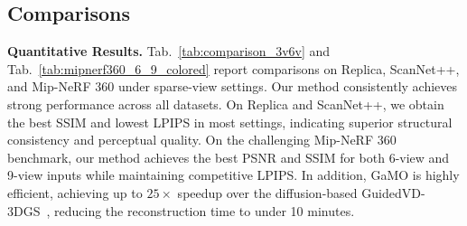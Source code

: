 \documentclass[runningheads]{llncs}
\begin{document}
\subsection{Comparisons}
\noindent\textbf{Quantitative Results.} 
Tab.~\ref{tab:comparison_3v6v} and Tab.~\ref{tab:mipnerf360_6_9_colored} report comparisons on Replica, ScanNet++, and Mip-NeRF 360 under sparse-view settings. Our method consistently achieves strong performance across all datasets. On Replica and ScanNet++, we obtain the best SSIM and lowest LPIPS in most settings, indicating superior structural consistency and perceptual quality. On the challenging Mip-NeRF 360 benchmark, our method achieves the best PSNR and SSIM for both 6-view and 9-view inputs while maintaining competitive LPIPS. In addition, GaMO is highly efficient, achieving up to $25\times$ speedup over the diffusion-based GuidedVD-3DGS~\cite{zhong2025taming}, reducing the reconstruction time to under 10 minutes.
\end{document}
